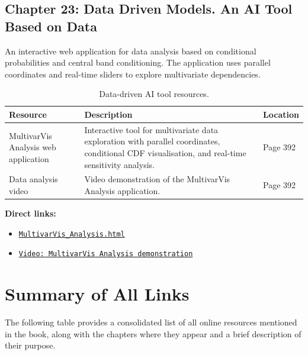 \subsection{Chapter 23: Data Driven Models. An AI Tool Based on Data}

An interactive web application for data analysis based on conditional probabilities and central band conditioning. The application uses parallel coordinates and real-time sliders to explore multivariate dependencies.

\begin{table}[H]
\centering
\caption{Data-driven AI tool resources.}
\begin{tabular}{p{3.5cm}p{8cm}p{2.5cm}}
\toprule
\textbf{Resource} & \textbf{Description} & \textbf{Location} \\
\midrule
MultivarVis Analysis web application & Interactive tool for multivariate data exploration with parallel coordinates, conditional CDF visualisation, and real-time sensitivity analysis. & Page 392 \\
Data analysis video & Video demonstration of the MultivarVis Analysis application. & Page 392 \\
\bottomrule
\end{tabular}
\end{table}

\noindent
\textbf{Direct links:}
\begin{itemize}
    \item \href{https://enriquecastilloron.github.io/mi-libro-interactivo/apps/MultivarVis_Analysis.html}{\nolinkurl{MultivarVis_Analysis.html}}
    \item \href{https://youtu.be/nn_Ii6je3Yg}{\nolinkurl{Video: MultivarVis Analysis demonstration}}
\end{itemize}

\section{Summary of All Links}

The following table provides a consolidated list of all online resources mentioned in the book, along with the chapters where they appear and a brief description of their purpose.

